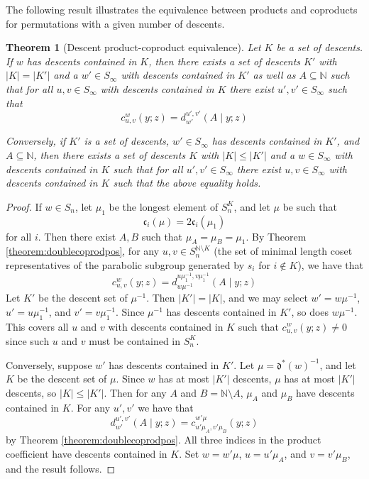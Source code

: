 \documentclass{amsart}
\newtheorem{theorem}{Theorem}[section]
\theoremstyle{definition}
\theoremstyle{remark}
\numberwithin{equation}{subsection}
\newcommand{\cpcf}[5]{d^{#1,#2}_{#3}\left(#4\mid #5\right)}
\newcommand{\dom}{\mathfrak{d}}
\newcommand{\ldom}{\dom^*}
\newcommand{\code}{\mathfrak{c}}
\begin{document}
The following result illustrates the equivalence between products and coproducts for permutations with a given number of descents.

\begin{theorem}[Descent product-coproduct equivalence] \label{theorem:kstep}
Let $K$ be a set of descents. If $w$ has descents contained in $K$, then there exists a set of descents $K'$ with $|K|=|K'|$ and a $w'\in S_\infty$ with  descents contained in $K'$ as well as $A\subseteq \mathbb{N}$ such that for all $u,v\in S_\infty$ with descents contained in $K$ there exist $u',v'\in S_\infty$ such that
$$c_{u,v}^w(y;z)=\cpcf{u'}{v'}{w'}{A}{y;z}$$

Conversely, if $K'$ is a set of descents, $w'\in S_\infty$ has descents contained in $K'$, and $A\subseteq \mathbb N$, then there exists a set of descents $K$ with $|K|\leq |K'|$ and a $w\in S_\infty$ with descents contained in $K$ such that for all $u',v'\in S_\infty$ there exist $u,v\in S_\infty$ with descents contained in $K$ such that the above equality holds.
\end{theorem}
\begin{proof}
If $w\in S_n$, let $\mu_1$ be the longest element of $S_n^K$, and let $\mu$ be such that
$$\code_i(\mu)=2\code_i(\mu_1)$$
for all $i$. Then there exist $A, B$ such that $\mu_A=\mu_B=\mu_1$. By Theorem \ref{theorem:doublecoprodpos}, for any $u,v\in S_n^{\mathbb{N}\setminus K}$ (the set of minimal length coset representatives of the parabolic subgroup generated by $s_i$ for $i\notin K$), we have that
$$c_{u,v}^w(y;z)=\cpcf{u\mu_1^{-1}}{v\mu_1^{-1}}{w\mu^{-1}}{A}{y;z}$$
Let $K'$ be the descent set of $\mu^{-1}$. Then $|K'|=|K|$, and we may select $w'=w\mu^{-1}$, $u'=u\mu_1^{-1}$, and $v'=v\mu_1^{-1}$. Since $\mu^{-1}$ has descents contained in $K'$, so does $w\mu^{-1}$. This covers all $u$ and $v$ with descents contained in $K$ such that $c_{u,v}^w(y;z)\neq 0$ since such $u$ and $v$ must be contained in $S_n^K$.

Conversely, suppose $w'$ has descents contained in $K'$. Let $\mu=\ldom(w)^{-1}$, and let $K$ be the descent set of $\mu$. Since $w$ has at most $|K'|$ descents, $\mu$ has at most $|K'|$ descents, so $|K|\leq |K'|$. Then for any $A$ and $B=\mathbb{N}\setminus A$, $\mu_A$ and $\mu_B$ have descents contained in $K$. For any $u',v'$ we have that
$$\cpcf{u'}{v'}{w'}{A}{y;z}=c_{u'\mu_A,v'\mu_B}^{w'\mu}(y;z)$$
by Theorem \ref{theorem:doublecoprodpos}. All three indices in the product coefficient have descents contained in $K$. Set $w=w'\mu$, $u=u'\mu_A$, and $v=v'\mu_B$, and the result follows.
\end{proof}
\end{document}
